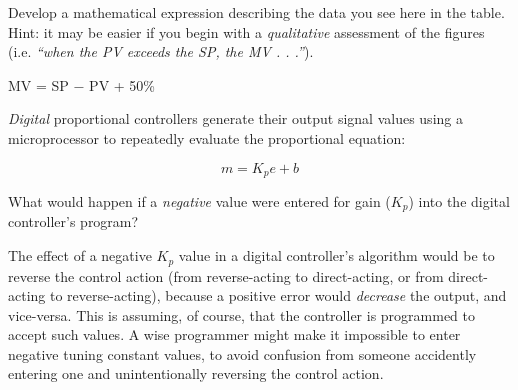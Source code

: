 Develop a mathematical expression describing the data you see here in the table.  Hint: it may be easier if you begin with a {\it qualitative} assessment of the figures (i.e. {\it ``when the PV exceeds the SP, the MV . . .''}).







MV = SP $-$ PV + 50\%













{\it Digital} proportional controllers generate their output signal values using a microprocessor to repeatedly evaluate the proportional equation:

$$m = K_p e + b$$
 
What would happen if a {\it negative} value were entered for gain ($K_p$) into the digital controller's program?







The effect of a negative $K_p$ value in a digital controller's algorithm would be to reverse the control action (from reverse-acting to direct-acting, or from direct-acting to reverse-acting), because a positive error would {\it decrease} the output, and vice-versa.  This is assuming, of course, that the controller is programmed to accept such values.  A wise programmer might make it impossible to enter negative tuning constant values, to avoid confusion from someone accidently entering one and unintentionally reversing the control action.








